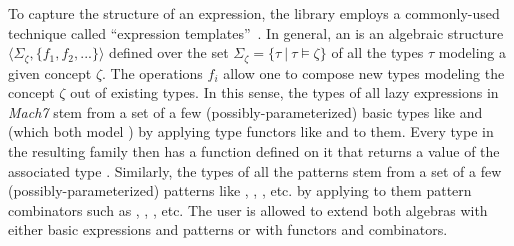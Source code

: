To capture the structure of an expression, the library employs a commonly-used 
technique called ``expression templates''~\cite{Veldhuizen95expressiontemplates, 
vandevoorde2003c++}. %
%
%
%
In general, an  is an algebraic structure $\langle \Sigma_\zeta,\{f_1,f_2,...\}\rangle$ 
defined over the set $\Sigma_\zeta = \{\tau~|~\tau \models \zeta\}$ of all the types $\tau$ 
modeling a given concept $\zeta$. The operations $f_i$ allow one to compose new types  
modeling the concept $\zeta$ out of existing types. In this sense, the types of all lazy 
expressions in \emph{Mach7} stem from a set of a few (possibly-parameterized) basic 
types like  and  (which both model ) 
by applying type functors like  and  to them. Every type 
in the resulting family then has a function  defined on it that 
returns a value of the associated type . Similarly, the types 
of all the patterns stem from a set of a few (possibly-parameterized) patterns like 
, , ,  etc. by applying to 
them pattern combinators such as , , 
,  etc. The user is allowed to extend both 
algebras with either basic expressions and patterns or with functors and combinators. 

